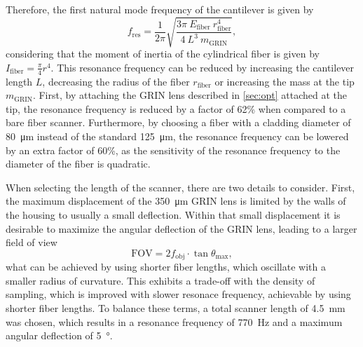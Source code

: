\documentclass[10pt]{iopart}
\begin{document}
Therefore, the first natural mode frequency of the cantilever is given by
\begin{equation}
	f_\mathrm{res} = \frac{1}{2 \pi} \sqrt{\frac{3 \pi\ E_\mathrm{fiber}\ r_\mathrm{fiber}^4}{4\ L^3\ m_{\mathrm{GRIN}}}}, 
	\label{eq:fres}
\end{equation}
considering that the moment of inertia of the cylindrical fiber is given by $I_\mathrm{fiber} = \frac{\pi}{4} r^4$. This resonance frequency can be reduced by increasing the cantilever length $L$, decreasing the radius of the fiber $r_\mathrm{fiber}$ or increasing the mass at the tip $m_{\mathrm{GRIN}}$. First, by attaching the GRIN lens described in \autoref{sec:opt} attached at the tip, the resonance frequency is reduced by a factor of 62\% when compared to a bare fiber scanner. Furthermore, by choosing a fiber with a cladding diameter of \SI{80}{\micro\meter} instead of the standard \SI{125}{\micro\meter}, the resonance frequency can be lowered by an extra factor of 60\%, as the sensitivity of the resonance frequency to the diameter of the fiber is quadratic. 

When selecting the length of the scanner, there are two details to consider. First, the maximum displacement of the \SI{350}{\micro\meter} GRIN lens is limited by the walls of the housing to usually a small deflection. Within that small displacement it is desirable to maximize the angular deflection of the GRIN lens, leading to a larger field of view
\begin{equation}
\mathrm{FOV} = 2 f_\mathrm{obj}\cdot \tan  \theta_\mathrm{max},%
\end{equation}
what can be achieved by using shorter fiber lengths, which oscillate with a smaller radius of curvature. This exhibits a trade-off with the density of sampling, which is improved with slower resonace frequency, achievable by using shorter fiber lengths. To balance these terms, a total scanner length of \SI{4.5}{\milli\meter} was chosen, which results in a resonance frequency of \SI{770}{\hertz} and a maximum angular deflection of \SI{5}{\degree}.
\end{document}

